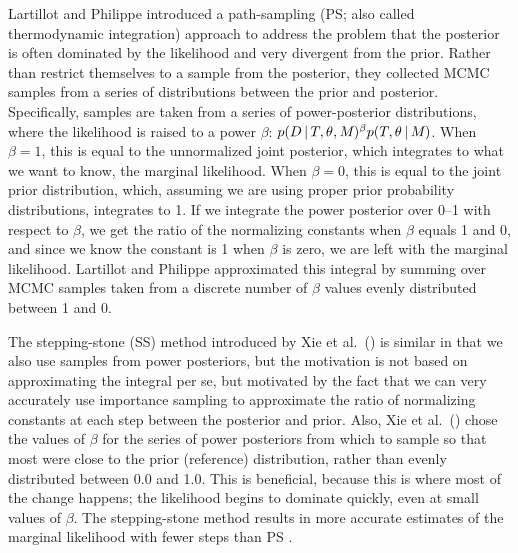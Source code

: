 Lartillot and Philippe \citeyear{Lartillot2006} introduced a path-sampling
(PS; also called thermodynamic integration) approach to address the problem that
the posterior is often dominated by the likelihood and very divergent from the
prior.
Rather than restrict themselves to a sample from the posterior, they collected
MCMC samples from a series of distributions between the prior and posterior.
Specifically, samples are taken from a series of power-posterior distributions,
where the likelihood is raised to a power $\beta$:
$ p(D \,|\, T, \theta_{}, M_{})^{\beta}
p(T, \theta_{} \,|\, M_{})$.
When $\beta = 1$, this is equal to the unnormalized joint posterior, which
integrates to what we want to know, the marginal likelihood.
When $\beta = 0$, this is equal to the joint prior distribution, which,
assuming we are using proper prior probability distributions, integrates to 1.
If we integrate the power posterior over 0--1 with respect to $\beta$, we get
the ratio of the normalizing constants when $\beta$ equals 1 and 0, and since
we know the constant is 1 when $\beta$ is zero, we are left with the marginal
likelihood.
Lartillot and Philippe \citeyear{Lartillot2006} approximated this integral by
summing over MCMC samples taken from a discrete number of $\beta$ values evenly
distributed between 1 and 0.

The stepping-stone (SS) method introduced by Xie et al.\ (\citeyear{Xie2011})
is similar in that we also use samples from power posteriors, but the
motivation is not based on approximating the integral per se, but motivated by
the fact that we can very accurately use importance sampling to approximate the
ratio of normalizing constants at each step between the posterior and prior.
Also, Xie et al.\ (\citeyear{Xie2011}) chose the values of $\beta$ for the
series of power posteriors from which to sample so that most were close to
the prior (reference) distribution, rather than evenly distributed between
0.0 and 1.0.
This is beneficial, because this is where most of the change happens; the
likelihood begins to dominate quickly, even at small values of $\beta$.
The stepping-stone method results in more accurate estimates of the marginal
likelihood with fewer steps than PS \citep{Xie2011}.

